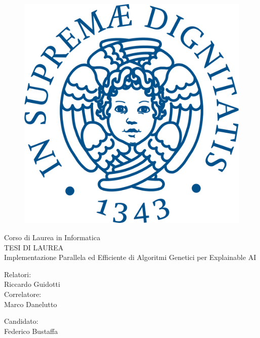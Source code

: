 \documentclass[12pt]{report}
\begin{document}
\begin{titlepage}
  \begin{figure}
    \centering\includegraphics[scale=0.5]{immagini/cherubino_pant541.png}
  \end{figure}

  \begin{center}
    {\LARGE{ Corso di Laurea in Informatica \\ }}
    \vspace{2cm}
    {\Large { TESI DI LAUREA }}\\
    \vspace{2cm}
    {\Large { Implementazione Parallela ed Efficiente di Algoritmi Genetici per Explainable AI }}
  \end{center}

  \vspace{2cm}

  \begin{minipage}[t]{0.47\textwidth}
    {\large{Relatori:\\ Riccardo Guidotti}}
    \vspace{0.5cm}
    {\large{\\Correlatore:\\ Marco Danelutto}}
  \end{minipage}\hfill\begin{minipage}[t]{0.47\textwidth}\raggedleft
    {\large{Candidato: \\ Federico Bustaffa\\ }}
  \end{minipage}

  \vspace{25mm}

\end{titlepage}
\end{document}

